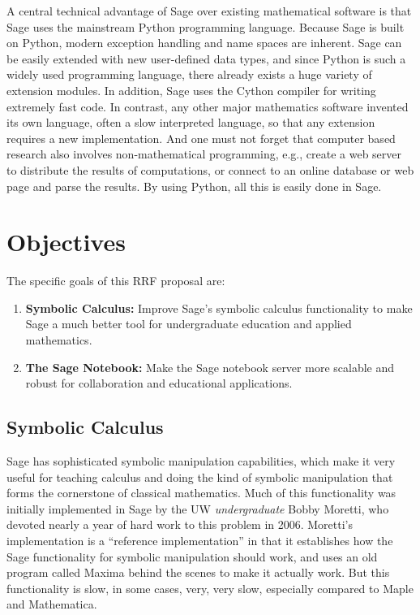 \documentclass[11pt]{article}
\begin{document}
A central technical advantage of Sage over existing mathematical
software is that Sage uses the mainstream Python programming language.
Because Sage is built on Python, modern exception handling and name
spaces are inherent. Sage can be easily extended with new user-defined
data types, and since Python is such a widely used programming
language, there already exists a huge variety of extension modules.
In addition, Sage uses the Cython compiler for writing extremely fast
code. In contrast, any other major mathematics software invented its
own language, often a slow interpreted language, so that any extension
requires a new implementation.  And one must not forget that computer
based research also involves non-mathematical programming, e.g.,
create a web server to distribute the results of computations, or
connect to an online database or web page and parse the results. By
using Python, all this is easily done in Sage.


\section{Objectives}

The specific goals of this RRF proposal are:
\begin{enumerate}
\item {\bf Symbolic Calculus:} Improve Sage's symbolic calculus
  functionality to make Sage a much better tool for undergraduate
  education and applied mathematics.
\item {\bf The Sage Notebook:} Make the Sage notebook server more
  scalable and robust for collaboration and educational applications.
\end{enumerate}

\subsection{Symbolic Calculus}
Sage has sophisticated symbolic manipulation capabilities, which make
it very useful for teaching calculus and doing the kind of symbolic
manipulation that forms the cornerstone of classical mathematics.  Much
of this functionality was initially implemented in Sage by the UW {\em
  undergraduate} Bobby Moretti, who devoted nearly a year of hard work
to this problem in 2006.  Moretti's implementation is a ``reference
implementation'' in that it establishes how the Sage functionality for
symbolic manipulation should work, and uses an old program called
Maxima behind the scenes to make it actually work.  But this
functionality is slow, in some cases, very, very slow, especially
compared to Maple and Mathematica.
\end{document}
